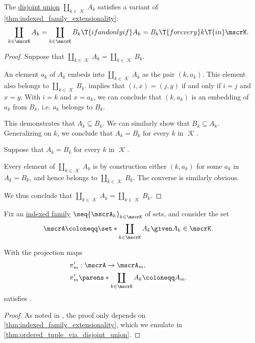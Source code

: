 \begin{proposition}\label{thm:ordered_tuple_via_disjoint_union}
  The \hyperref[def:disjoint_union]{disjoint union} \( \coprod_{k \in \mscrK} A_k \) satisfies a variant of \cref{thm:indexed_family_extensionality}:
  \begin{equation*}
    \coprod_{k \in \mscrK} A_k = \coprod_{k \in \mscrK} B_k \T{if and only if} A_k = B_k \T{for every} k \T{in} \mscrK.
  \end{equation*}
\end{proposition}
\begin{proof}
  \SufficiencySubProof Suppose that \( \coprod_{k \in \mscrK} A_k = \coprod_{k \in \mscrK} B_k \).

  An element \( a_k \) of \( A_k \) embeds into \( \coprod_{k \in \mscrK} A_k \) as the pair \( (k, a_k) \). This element also belongs to \( \coprod_{k \in \mscrK} B_k \).  implies that \( (i, x) = (j, y) \) if and only if \( i = j \) and \( x = y \). With \( i = k \) and \( x = a_k \), we can conclude that \( (k, a_k) \) is an embedding of \( a_k \) from \( B_k \), i.e. \( a_k \) belongs to \( B_k \).

  This demonstrates that \( A_k \subseteq B_k \). We can similarly show that \( B_k \subseteq A_k \). Generalizing on \( k \), we conclude that \( A_k = B_k \) for every \( k \) in \( \mscrK \).

  \NecessitySubProof Suppose that \( A_k = B_k \) for every \( k \) in \( \mscrK \).

  Every element of \( \coprod_{k \in \mscrK} A_k \) is by construction either \( (k, a_k) \) for some \( a_k \) in \( A_k = B_k \), and hence belongs to \( \coprod_{k \in \mscrK} B_k \). The converse is similarly obvious.

  We thus conclude that \( \coprod_{k \in \mscrK} A_k = \coprod_{k \in \mscrK} B_k \).
\end{proof}

\begin{corollary}\label{thm:cartesian_product_via_disjoint_union}
  Fix an \hyperref[def:indexed_family]{indexed family} \( \seq{ \mscrA_k }_{k \in \mscrK} \) of sets, and consider the set
  \begin{equation*}
    \mscrA \coloneqq \set*{ \coprod_{k \in \mscrK} A_k \given A_k \in \mscrK }.
  \end{equation*}

  With the projection maps
  \begin{equation*}
    \begin{aligned}
      &\pi'_m: \mscrA \to \mscrA_m, \\
      &\pi'_m\parens*{ \coprod_{k \in \mscrK} A_k } \coloneqq A_m.
    \end{aligned}
  \end{equation*}
  satisfies .
\end{corollary}
\begin{proof}
  As noted in , the proof only depends on \cref{thm:indexed_family_extensionality}, which we emulate in \cref{thm:ordered_tuple_via_disjoint_union}.
\end{proof}

